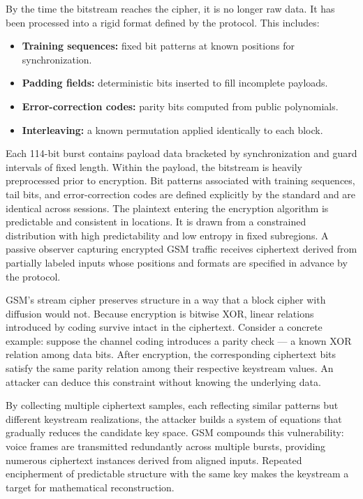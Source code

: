 By the time the bitstream reaches the cipher, it is no longer raw data. It has been processed into a rigid format defined by the protocol. This includes:

\begin{itemize}
  \item \textbf{Training sequences:} fixed bit patterns at known positions for synchronization.
  \item \textbf{Padding fields:} deterministic bits inserted to fill incomplete payloads.
  \item \textbf{Error-correction codes:} parity bits computed from public polynomials.
  \item \textbf{Interleaving:} a known permutation applied identically to each block.
\end{itemize}

Each 114-bit burst contains payload data bracketed by synchronization and guard intervals of fixed length. Within the payload, the bitstream is heavily preprocessed prior to encryption. Bit patterns associated with training sequences, tail bits, and error-correction codes are defined explicitly by the standard and are identical across sessions. The plaintext entering the encryption algorithm is predictable and consistent in locations. It is drawn from a constrained distribution with high predictability and low entropy in fixed subregions. A passive observer capturing encrypted GSM traffic receives ciphertext derived from partially labeled inputs whose positions and formats are specified in advance by the protocol.

GSM's stream cipher preserves structure in a way that a block cipher with diffusion would not. Because encryption is bitwise XOR, linear relations introduced by coding survive intact in the ciphertext. Consider a concrete example: suppose the channel coding introduces a parity check — a known XOR relation among data bits. After encryption, the corresponding ciphertext bits satisfy the same parity relation among their respective keystream values. An attacker can deduce this constraint without knowing the underlying data.

By collecting multiple ciphertext samples, each reflecting similar patterns but different keystream realizations, the attacker builds a system of equations that gradually reduces the candidate key space. GSM compounds this vulnerability: voice frames are transmitted redundantly across multiple bursts, providing numerous ciphertext instances derived from aligned inputs. Repeated encipherment of predictable structure with the same key makes the keystream a target for mathematical reconstruction.

